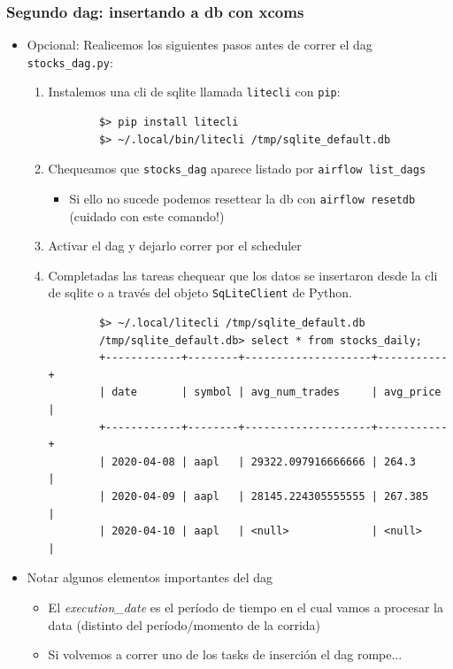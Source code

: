 \documentclass[leqno, 10pt, envcountsect]{beamer}
\numberwithin{equation}{section}
\theoremstyle{definition}
\theoremstyle{example}
\numberwithin{figure}{section}
\numberwithin{table}{section}
\let\olditem\item
\renewcommand{\item}{%
\olditem\vspace{1pt}}
\begin{document}
\begin{frame}[fragile=singleslide]
  \frametitle{Segundo dag: insertando a db con xcoms}
  \begin{itemize}
    \item Opcional: Realicemos los siguientes pasos antes de correr el dag
      \texttt{stocks_dag.py}:
      \begin{enumerate}
        \item Instalemos una cli de sqlite llamada \texttt{litecli} con \texttt{pip}:
        \begin{verbatim}
        $> pip install litecli
        $> ~/.local/bin/litecli /tmp/sqlite_default.db
        \end{verbatim}
      \item Chequeamos que \texttt{stocks_dag} aparece listado por
        \texttt{airflow list_dags}
        \begin{itemize}
          \item Si ello no sucede podemos resettear la db con \texttt{airflow
            resetdb} (cuidado con este comando!)
        \end{itemize}
      \item Activar el dag y dejarlo correr por el scheduler
      \item Completadas las tareas chequear que los datos se insertaron desde
        la cli de sqlite o a través del objeto \texttt{SqLiteClient} de Python.
        \begin{verbatim}
        $> ~/.local/litecli /tmp/sqlite_default.db
        /tmp/sqlite_default.db> select * from stocks_daily;
        +------------+--------+--------------------+-----------+
        | date       | symbol | avg_num_trades     | avg_price |
        +------------+--------+--------------------+-----------+
        | 2020-04-08 | aapl   | 29322.097916666666 | 264.3     |
        | 2020-04-09 | aapl   | 28145.224305555555 | 267.385   |
        | 2020-04-10 | aapl   | <null>             | <null>    |
        \end{verbatim}
      \end{enumerate}
    \item Notar algunos elementos importantes del dag
      \begin{itemize}
        \item El \textit{execution_date} es el período de tiempo en el cual
          vamos a procesar la data (distinto del período/momento de la corrida)
        \item Si volvemos a correr uno de los tasks de inserción el dag
          rompe...
      \end{itemize}
  \end{itemize}
\end{frame}
\end{document}
